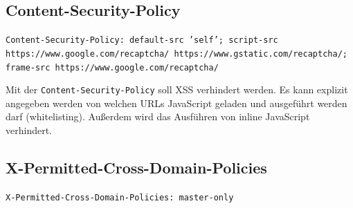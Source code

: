 \documentclass[12pt,DIV14,BCOR10mm,a4paper,parskip=half-,headsepline,headinclude,english,ngerman,bibliography=totocnumbered]{scrreprt}
\begin{document}
\subsection{Content-Security-Policy}
\begin{sloppypar}
\texttt{Content-Security-Policy: default-src 'self'; script-src https://www.google.com/recaptcha/ https://www.gstatic.com/recaptcha/; frame-src https://www.google.com/recaptcha/}
\end{sloppypar}
Mit der \texttt{Content-Security-Policy} soll XSS verhindert werden. Es kann explizit angegeben werden von welchen URLs JavaScript geladen und ausgeführt werden darf (whitelisting). Außerdem wird das Ausführen von inline JavaScript verhindert.

\subsection{X-Permitted-Cross-Domain-Policies}
\texttt{X-Permitted-Cross-Domain-Policies: master-only}\newline

\printacronyms[title=Abkürzungsverzeichnis,toctitle=Abkürzungsverzeichnis]
\printglossary[type=main]

\listoffigures      %

\end{document}
